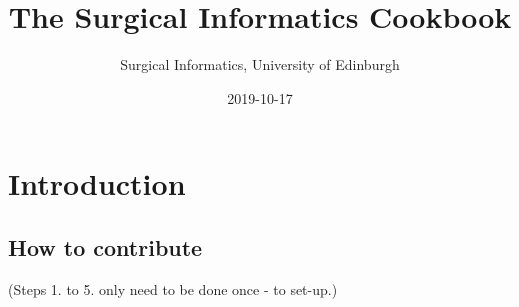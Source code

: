 \documentclass[]{book}
\title{The Surgical Informatics Cookbook}
\author{Surgical Informatics, University of Edinburgh}
\date{2019-10-17}
\theoremstyle{definition}
\theoremstyle{definition}
\theoremstyle{definition}
\theoremstyle{remark}
\begin{document}
\maketitle

{
\setcounter{tocdepth}{1}
\tableofcontents
}
\hypertarget{section}{%
\chapter*{}\label{section}}

\hypertarget{intro}{%
\chapter{Introduction}\label{intro}}

\hypertarget{how-to-contribute}{%
\section{How to contribute}\label{how-to-contribute}}

(Steps 1. to 5. only need to be done once - to set-up.)
\end{document}
